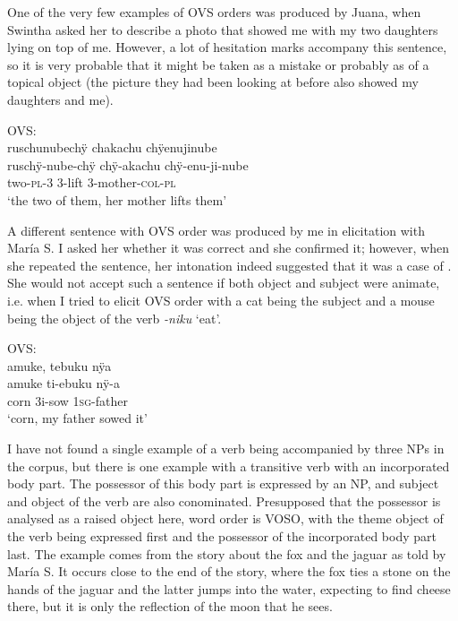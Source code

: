 One of the very few examples of OVS orders was produced by Juana, when Swintha asked her to describe a photo that showed me with my two daughters lying on top of me. However, a lot of hesitation marks accompany this sentence, so it is very probable that it might be taken as a mistake or probably as  of a topical object (the picture they had been looking at before also showed my daughters and me).


\ea\label{ex:OVSfirst}
\begingl
\glpreamble \textup{OVS:}\\ruschunubechÿ chakachu chÿenujinube\\
\gla ruschÿ-nube-chÿ chÿ-akachu chÿ-enu-ji-nube\\
\glb two-\textsc{pl}-3 3-lift 3-mother-\textsc{col}-\textsc{pl}\\
\glft ‘the two of them, her mother lifts them’
\endgl
\trailingcitation{[jxx-p141024s-1.21]}
\xe

A different sentence with OVS order was produced by me in elicitation with María S. I asked her whether it was correct and she confirmed it; however, when she repeated the sentence, her intonation indeed suggested that it was a case of . She would not accept such a sentence if both object and subject were animate, i.e. when I tried to elicit OVS order with a cat being the subject and a mouse being the object of the verb \textit{-niku} ‘eat’.

\ea\label{ex:OVSsecond}
\begingl
\glpreamble \textup{OVS:}\\amuke, tebuku nÿa\\
\gla amuke ti-ebuku nÿ-a\\
\glb corn 3i-sow 1\textsc{sg}-father\\
\glft ‘corn, my father sowed it’
\endgl
\trailingcitation{[rxx-e181024l]}
\xe




I have not found a single example of a  verb being accompanied by three NPs in the corpus, but there is one example with a transitive verb with an incorporated body part. The possessor of this body part is expressed by an NP, and subject and object of the verb are also conominated. Presupposed that the possessor is analysed as a raised object here, word order is VOSO, with the theme object of the verb being expressed first and the possessor of the incorporated body part last. The example comes from the story about the fox and the jaguar as told by María S. It occurs close to the end of the story, where the fox ties a stone on the hands of the jaguar and the latter jumps into the water, expecting to find cheese there, but it is only the reflection of the moon that he sees.


